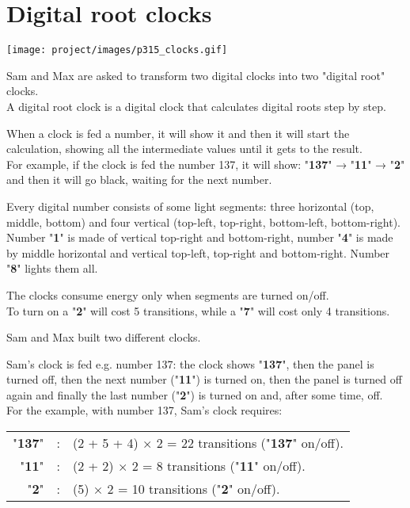 \section[Problem \#315: Digital root clocks]{Digital root clocks}
\label{sec:problem_315}

\texttt{[image: project/images/p315\_clocks.gif]}

Sam and Max are asked to transform two digital clocks into two "digital
root" clocks.\\
A digital root clock is a digital clock that calculates digital roots
step by step.

When a clock is fed a number, it will show it and then it will start the
calculation, showing all the intermediate values until it gets to the
result.\\
For example, if the clock is fed the number 137, it will show:
"\textbf{137}" → "\textbf{11}" → "\textbf{2}" and then it will go black,
waiting for the next number.

Every digital number consists of some light segments: three horizontal
(top, middle, bottom) and four vertical (top-left, top-right,
bottom-left, bottom-right).\\
Number "\textbf{1}" is made of vertical top-right and bottom-right,
number "\textbf{4}" is made by middle horizontal and vertical top-left,
top-right and bottom-right. Number "\textbf{8}" lights them all.

The clocks consume energy only when segments are turned on/off.\\
To turn on a "\textbf{2}" will cost 5 transitions, while a "\textbf{7}"
will cost only 4 transitions.

Sam and Max built two different clocks.

Sam's clock is fed e.g. number 137: the clock shows "\textbf{137}", then
the panel is turned off, then the next number ("\textbf{11}") is turned
on, then the panel is turned off again and finally the last number
("\textbf{2}") is turned on and, after some time, off.\\
For the example, with number 137, Sam's clock requires:\\

\begin{longtable}[]{@{}rll@{}}
\toprule
\endhead
"\textbf{137}" & : & (2 + 5 + 4) × 2 = 22 transitions ("\textbf{137}"
on/off). \\
"\textbf{11}" & : & (2 + 2) × 2 = 8 transitions ("\textbf{11}"
on/off). \\
"\textbf{2}" & : & (5) × 2 = 10 transitions ("\textbf{2}" on/off). \\
\bottomrule
\end{longtable}

